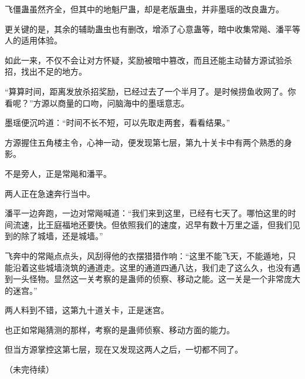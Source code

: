 \begin{this_body}
飞僵蛊虽然齐全，但其中的地魁尸蛊，却是老版蛊虫，并非墨瑶的改良蛊方。

更关键的是，其余的辅助蛊虫也有删改，增添了心意蛊等，暗中收集常飚、潘平等人的适用体验。

如此一来，不仅不会让对方怀疑，奖励被暗中篡改，而且还能主动替方源试验杀招，找出不足的地方。

“算算时间，距离发放杀招奖励，已经过去了一个半月了。是时候捞鱼收网了。你看呢？”方源以商量的口吻，问脑海中的墨瑶意志。

墨瑶便沉吟道：“时间不长不短，可以先取走两套，看看结果。”

方源握住五角楼主令，心神一动，便发现第七层，第九十关卡中有两个熟悉的身影。

不是旁人，正是常飚和潘平。

两人正在急速奔行当中。

潘平一边奔跑，一边对常飚喊道：“我们来到这里，已经有七天了。哪怕这里的时间流速，比王庭福地还要快。但依照我们的速度，迟早有数十万里之遥，但我们见到的除了城墙，还是城墙。”

飞奔中的常飚点点头，风刮得他的衣摆猎猎作响：“这里不能飞天，不能遁地，只能沿着这些城墙浇筑的通道走。这里的通道四通八达，我们走了这么久，也没有遇到一头怪物。显然这一关考察的是蛊师的侦察、移动之能。这一关是一个非常庞大的迷宫。”

两人料到不错，这第九十道关卡，正是迷宫。

也正如常飚猜测的那样，考察的是蛊师侦察、移动方面的能力。

但当方源掌控这第七层，现在又发现这两人之后，一切都不同了。

（未完待续）

\end{this_body}

